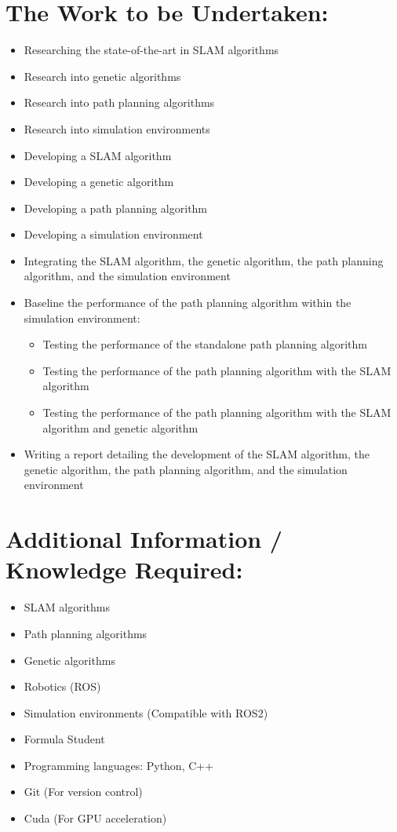 \documentclass[11pt]{article}
\begin{document}
    \section*{The Work to be Undertaken:}
    \begin{itemize}
        \item Researching the state-of-the-art in SLAM algorithms
        \item Research into genetic algorithms
        \item Research into path planning algorithms
        \item Research into simulation environments
        \item Developing a SLAM algorithm
        \item Developing a genetic algorithm
        \item Developing a path planning algorithm
        \item Developing a simulation environment
        \item Integrating the SLAM algorithm, the genetic algorithm, the path planning algorithm, and the simulation environment
        \item Baseline the performance of the path planning algorithm within the simulation environment:
        \begin{itemize}
            \item Testing the performance of the standalone path planning algorithm
            \item Testing the performance of the path planning algorithm with the SLAM algorithm
            \item Testing the performance of the path planning algorithm with the SLAM algorithm and genetic algorithm
        \end{itemize}
        \item Writing a report detailing the development of the SLAM algorithm, the genetic algorithm, the path planning algorithm, and the simulation environment
    \end{itemize}

    \section*{Additional Information / Knowledge Required:}
    \begin{itemize}
        \item SLAM algorithms
        \item Path planning algorithms
        \item Genetic algorithms
        \item Robotics (ROS)
        \item Simulation environments (Compatible with ROS2)
        \item Formula Student
        \item Programming languages: Python, C++
        \item Git (For version control)
        \item Cuda (For GPU acceleration)
    \end{itemize}
\end{document}
